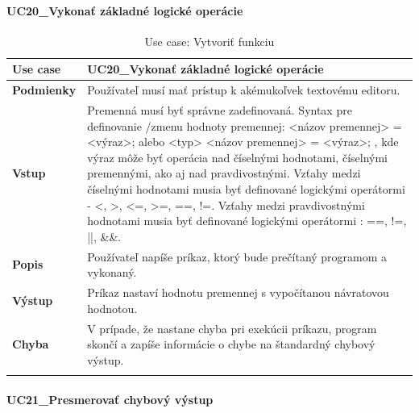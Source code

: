 {\begin{center}
\begin{longtable}{|p{2.5cm}|p{12.2cm}|}
	\end{longtable}
\end{center}
\paragraph{UC20\_Vykonať základné logické operácie}
\begin{center}
	\begin{longtable}{|p{2.5cm}|p{12.2cm}|}
		
			\hline
			\textbf{Use case} & UC20\_Vykonať základné logické operácie\\ 
			\hline
			\textbf{Podmienky} & Používateľ musí mať prístup k akémukoľvek textovému editoru.  \\ 
			\hline
			\textbf{Vstup} & Premenná musí byť správne zadefinovaná. \newline
			Syntax pre definovanie /zmenu hodnoty premennej:  \newline
			<názov premennej> = <výraz>; alebo \newline
			<typ> <názov premennej> = <výraz>;
			\newline
			, kde výraz môže byť operácia nad číselnými hodnotami, číselnými premennými, ako aj nad pravdivostnými.\newline
			Vzťahy medzi číselnými hodnotami musia byť definované logickými operátormi - <, >, <=, >=, ==, !=.\newline
			Vzťahy medzi pravdivostnými hodnotami musia byť definované logickými operátormi : ==, !=, ||, \&\&.  \\
			\hline
			\textbf{Popis} & Používateľ napíše príkaz, ktorý bude prečítaný programom a vykonaný.\\ 
			\hline
			\textbf{Výstup} & Príkaz nastaví hodnotu premennej s vypočítanou návratovou hodnotou.\\
			\hline
			\textbf{Chyba} & V prípade, že nastane chyba pri exekúcii príkazu, program skončí a zapíše informácie o chybe na štandardný chybový výstup.\\
			\hline
		\caption{Use case: Vytvoriť funkciu}
		\label{table:1}
		
	\end{longtable}
\end{center}

\paragraph{UC21\_Presmerovať chybový výstup}
\begin{center}
	\begin{longtable}{|p{2.5cm}|p{12.2cm}|}
		

\end{longtable}
\end{center}}
